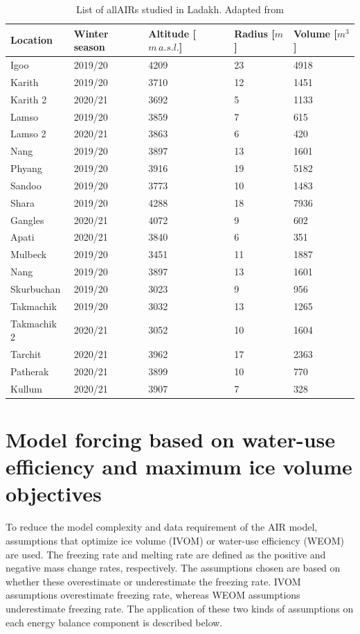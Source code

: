 \begin{table}[htb]
  \centering
  \caption{List of all\ac{AIRs} studied in Ladakh. Adapted from \citet{mariagruberIceStupasLadakh2022}}
	\label{tab:Ladakh_AIRs}
	\begin{tabular}{|lllll|}
    \hline
    \textbf{Location}     & \textbf{Winter season} & \textbf{Altitude [$m\,a.s.l.$]} & \textbf{
    Radius [$m$]} & \textbf{Volume [$m^3$]} \\ \hline
    Igoo & 2019/20 & 4209 & 23 & 4918  \\
    Karith & 2019/20 & 3710 & 12 & 1451  \\
    Karith 2 & 2020/21 & 3692 & 5 & 1133  \\
    Lamso & 2019/20 & 3859 & 7 & 615  \\
    Lamso 2& 2020/21 & 3863 & 6 & 420  \\
    Nang& 2019/20 & 3897 & 13 & 1601 \\
    Phyang& 2019/20 & 3916 & 19 & 5182 \\
    Sandoo& 2019/20 & 3773 & 10 & 1483 \\
    Shara& 2019/20 & 4288 & 18 & 7936 \\
    Gangles& 2020/21 & 4072 & 9 & 602 \\
    Apati& 2020/21 & 3840 & 6 & 351 \\
    Mulbeck& 2019/20 & 3451 & 11 & 1887\\
    Nang& 2019/20 & 3897 & 13 & 1601\\
    Skurbuchan& 2019/20 & 3023 & 9 & 956\\
    Takmachik& 2019/20 & 3032 & 13 &1265\\
    Takmachik 2& 2020/21 & 3052 & 10 &1604\\
    Tarchit& 2020/21 & 3962 & 17 &2363\\
    Patherak& 2020/21 & 3899 & 10 &770\\
    Kullum& 2020/21 & 3907 & 7 &328\\ \hline
	\end{tabular}
\end{table}

\section{Model forcing based on water-use efficiency and maximum ice volume objectives}
\label{sec:auto_software}

To reduce the model complexity and data requirement of the \ac{AIR} model, assumptions that optimize ice volume (IVOM) or
water-use efficiency (WEOM) are used. The freezing rate and melting rate are defined as the positive and
negative mass change rates, respectively. The assumptions chosen are based on whether these overestimate or
underestimate the freezing rate. IVOM assumptions overestimate freezing rate, whereas WEOM assumptions
underestimate freezing rate. The application of these two kinds of assumptions on each energy balance component
is described below. 

